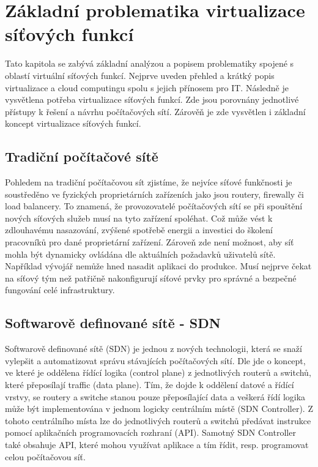 \chapter{Základní problematika virtualizace síťových funkcí}

Tato kapitola se zabývá základní analýzou a popisem problematiky spojené s oblastí virtuální síťových funkcí. Nejprve uveden přehled a krátký popis virtualizace a cloud computingu spolu s jejich přínosem pro IT. Následně je vysvětlena potřeba virtualizace síťových funkcí. Zde jsou porovnány jednotlivé přístupy k řešení a návrhu počítačových sítí. Zárověň je zde vysvětlen i základní koncept virtualizace síťových funkcí.

\section{Tradiční počítačové sítě}

Pohledem na tradiční počítačovou sít zjistíme, že nejvíce síťové funkčnosti je soustředěno ve fyzických proprietárních zařízeních jako jsou routery, firewally či load balancery. To znamená, že provozovatelé počítačových sítí se při spouštění nových síťových služeb musí na tyto zařízení spoléhat. Což může vést k zdlouhavému nasazování, zvýšené spotřebě energii a investici do školení pracovníků pro dané proprietární zařízení. Zároveň zde není možnost, aby síť mohla být dynamicky ovládána dle aktuálních požadavků uživatelů sítě. Například vývojář nemůže hned nasadit aplikaci do produkce. Musí nejprve čekat na síťový tým než patřičně nakonfigurují síťové prvky pro správné a bezpečné fungování celé infrastruktury.

\section{Softwarově definované sítě - SDN}

Softwarově definované sítě (SDN) je jednou z nových technologii, která se snaží vylepšit a automatizovat správu stávajících počítačových sítí. Dle \cite{SDN_clanek} jde o koncept, ve které je oddělena řídící logika (control plane) z jednotlivých routerů a switchů, které přeposílají traffic (data plane). Tím, že dojde k oddělení datové a řídící vrstvy, se routery a switche stanou pouze přeposílající data a veškerá řídí logika může být implementována v jednom logicky centrálním místě (SDN Controller). Z tohoto centrálního místa lze do jednotlivých routerů a switchů předávat instrukce pomocí aplikačních programovacích rozhraní (API). Samotný SDN Controller také obsahuje API, které mohou využívat aplikace a tím řídit, resp. programovat celou počítačovou síť.

